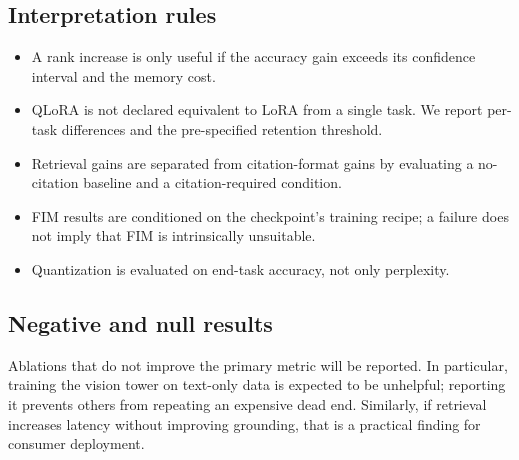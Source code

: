 \subsection{Interpretation rules}

\begin{itemize}[leftmargin=1.4em]
  \item A rank increase is only useful if the accuracy gain exceeds its
  confidence interval and the memory cost.
  \item QLoRA is not declared equivalent to LoRA from a single task. We report
  per-task differences and the pre-specified retention threshold.
  \item Retrieval gains are separated from citation-format gains by evaluating a
  no-citation baseline and a citation-required condition.
  \item FIM results are conditioned on the checkpoint's training recipe; a
  failure does not imply that FIM is intrinsically unsuitable.
  \item Quantization is evaluated on end-task accuracy, not only perplexity.
\end{itemize}

\subsection{Negative and null results}

Ablations that do not improve the primary metric will be reported. In
particular, training the vision tower on text-only data is expected to be
unhelpful; reporting it prevents others from repeating an expensive dead end.
Similarly, if retrieval increases latency without improving grounding, that is a
practical finding for consumer deployment.

